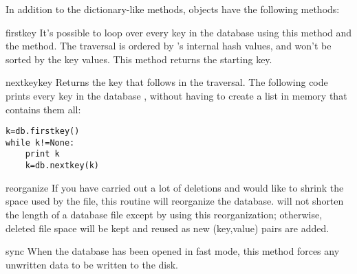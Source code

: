 In addition to the dictionary-like methods,  objects have the
following methods:

\begin{funcdesc}{firstkey}{}
It's possible to loop over every key in the database using this method
and the  method.  The traversal is ordered by 's
internal hash values, and won't be sorted by the key values.  This
method returns the starting key.
\end{funcdesc}

\begin{funcdesc}{nextkey}{key}
Returns the key that follows  in the traversal.  The
following code prints every key in the database , without having to
create a list in memory that contains them all:
\begin{verbatim}
k=db.firstkey()
while k!=None:
    print k
    k=db.nextkey(k)
\end{verbatim}
\end{funcdesc}

\begin{funcdesc}{reorganize}{}
If you have carried out a lot of deletions and would like to shrink
the space used by the  file, this routine will reorganize the
database.   will not shorten the length of a database file except
by using this reorganization; otherwise, deleted file space will be
kept and reused as new (key,value) pairs are added.
\end{funcdesc}

\begin{funcdesc}{sync}{}
When the database has been opened in fast mode, this method forces any
unwritten data to be written to the disk.
\end{funcdesc}


